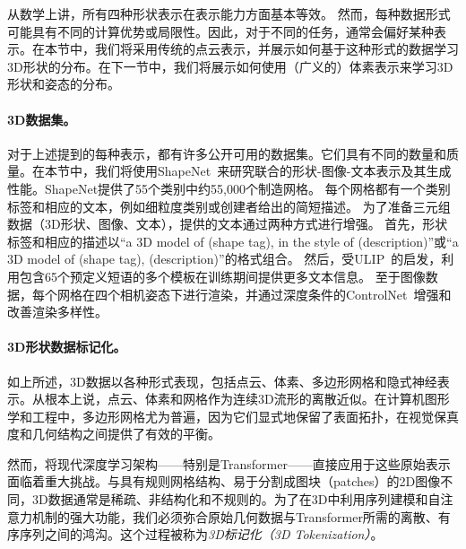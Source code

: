 \documentclass[../../book-main_zh.tex]{subfiles}
\begin{document}
从数学上讲，所有四种形状表示在表示能力方面基本等效。
然而，每种数据形式可能具有不同的计算优势或局限性。因此，对于不同的任务，通常会偏好某种表示。在本节中，我们将采用传统的点云表示，并展示如何基于这种形式的数据学习3D形状的分布。在下一节中，我们将展示如何使用（广义的）体素表示来学习3D形状和姿态的分布。

\paragraph{3D数据集。}
对于上述提到的每种表示，都有许多公开可用的数据集。它们具有不同的数量和质量。在本节中，我们将使用ShapeNet~\cite{chang2015shapenet}来研究联合的形状-图像-文本表示及其生成性能。ShapeNet提供了55个类别中约55,000个制造网格。
每个网格都有一个类别标签和相应的文本，例如细粒度类别或创建者给出的简短描述。
为了准备三元组数据（3D形状、图像、文本），提供的文本通过两种方式进行增强。
首先，形状标签和相应的描述以“a 3D model of (shape tag), in the style of (description)”或“a 3D model of (shape tag), (description)”的格式组合。
然后，受ULIP~\cite{10203465}的启发，利用包含65个预定义短语的多个模板在训练期间提供更多文本信息。
至于图像数据，每个网格在四个相机姿态下进行渲染，并通过深度条件的ControlNet~\cite{10377881}增强和改善渲染多样性。

\paragraph{3D形状数据标记化。}
\label{sec:3d_tokenization}
如上所述，3D数据以各种形式表现，包括点云、体素、多边形网格和隐式神经表示。从根本上说，点云、体素和网格作为连续3D流形的离散近似。在计算机图形学和工程中，多边形网格尤为普遍，因为它们显式地保留了表面拓扑，在视觉保真度和几何结构之间提供了有效的平衡。

然而，将现代深度学习架构——特别是Transformer——直接应用于这些原始表示面临着重大挑战。与具有规则网格结构、易于分割成图块（patches）的2D图像不同，3D数据通常是稀疏、非结构化和不规则的。为了在3D中利用序列建模和自注意力机制的强大功能，我们必须弥合原始几何数据与Transformer所需的离散、有序序列之间的鸿沟。这个过程被称为\textit{3D标记化（3D Tokenization）}。
\end{document}
